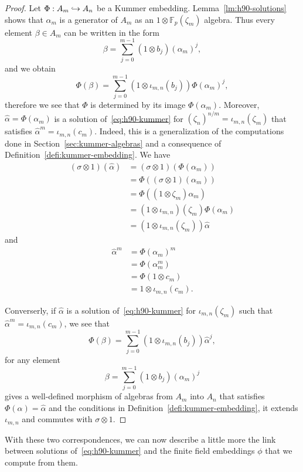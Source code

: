\begin{proof}
Let $\Phi:A_m\hookrightarrow A_n$ be a Kummer embedding. Lemma~\ref{lm:h90-solutions} shows
that $\alpha_m$ is a generator of $A_m$ as an $1\otimes\mathbb{F}_{p}(\zeta_m)$
algebra. Thus every element $\beta\in A_m$ can be written in the form
\[
  \beta = \sum_{j=0}^{m-1}(1\otimes b_j)(\alpha_m)^j,
\]
and we obtain
\[
  \Phi(\beta) = \sum_{j=0}^{m-1}(1\otimes\iota_{m, n}(b_j))\Phi(\alpha_m)^j,
\]
therefore we see that $\Phi$ is determined by its image $\Phi(\alpha_m)$. Moreover,
$\hat\alpha=\Phi(\alpha_m)$ is a solution of~\eqref{eq:h90-kummer} for
$(\zeta_n)^{n/m}=\iota_{m,n}(\zeta_m)$ that satisfies
$\hat\alpha^m=\iota_{m, n}(c_m)$. Indeed, this is a generalization of the
computations done in Section~\ref{sec:kummer-algebras} and a consequence of
Definition~\ref{defi:kummer-embedding}. We have
\begin{align*}
 (\sigma\otimes1)(\hat\alpha) &=(\sigma\otimes1)(\Phi(\alpha_m))\\
 &= \Phi( (\sigma\otimes1)(\alpha_m))\\
 &= \Phi((1\otimes\zeta_m)\alpha_m)\\
 &= (1\otimes\iota_{m, n})(\zeta_m)\Phi(\alpha_m)\\
 &= (1\otimes\iota_{m, n}(\zeta_m))\hat\alpha
\end{align*}
and
\begin{align*}
 \hat\alpha^m &= \Phi(\alpha_m)^m\\
 &= \Phi(\alpha_m^m)\\
 &= \Phi(1\otimes c_m)\\
 &= 1\otimes\iota_{m, n}(c_m).
\end{align*}

 Converserly, if $\hat\alpha$ is a solution of~\eqref{eq:h90-kummer} for
 $\iota_{m, n}(\zeta_m)$ such that $\hat\alpha^m=\iota_{m, n}(c_m)$, we see that
 \[
  \Phi(\beta) = \sum_{j=0}^{m-1}(1\otimes\iota_{m, n}(b_j))\hat\alpha^j,
 \]
 for any element
 \[
  \beta = \sum_{j=0}^{m-1}(1\otimes b_j)(\alpha_m)^j
 \]
 gives a well-defined morphism of algebras from  $A_m$ into $A_n$ that satisfies
 $\Phi(\alpha)=\hat\alpha$ and
 the conditions in Definition~\ref{defi:kummer-embedding}, \ie it extends
 $\iota_{m, n}$ and commutes with $\sigma\otimes1$.
\end{proof}
With these two correspondences, we can now describe a little more the link
between solutions of~\eqref{eq:h90-kummer} and the finite field embeddings
$\phi$ that we compute from them.
